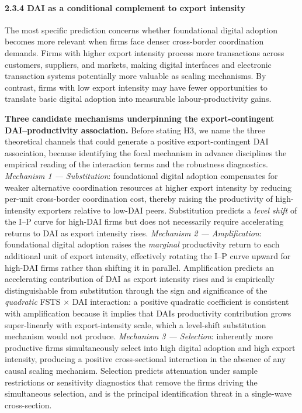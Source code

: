 \documentclass[12pt,a4paper]{article}
\begin{document}
\hypertarget{234-dai-as-a-conditional-complement-to-export-intensity}{%
\paragraph{2.3.4 DAI as a conditional complement to export
intensity}\label{234-dai-as-a-conditional-complement-to-export-intensity}}

The most specific prediction concerns whether foundational digital
adoption becomes more relevant when firms face denser cross-border
coordination demands. Firms with higher export intensity process more
transactions across customers, suppliers, and markets, making digital
interfaces and electronic transaction systems potentially more valuable
as scaling mechanisms. By contrast, firms with low export intensity may
have fewer opportunities to translate basic digital adoption into
measurable labour-productivity gains.

\textbf{Three candidate mechanisms underpinning the export-contingent
DAI--productivity association.} Before stating H3, we name the three
theoretical channels that could generate a positive export-contingent
DAI association, because identifying the focal mechanism in advance
disciplines the empirical reading of the interaction terms and the
robustness diagnostics. \emph{Mechanism 1 --- Substitution}:
foundational digital adoption compensates for weaker alternative
coordination resources at higher export intensity by reducing per-unit
cross-border coordination cost, thereby raising the productivity of
high-intensity exporters relative to low-DAI peers. Substitution
predicts a \emph{level shift} of the I--P curve for high-DAI firms but
does not necessarily require accelerating returns to DAI as export
intensity rises. \emph{Mechanism 2 --- Amplification}: foundational
digital adoption raises the \emph{marginal} productivity return to each
additional unit of export intensity, effectively rotating the I--P curve
upward for high-DAI firms rather than shifting it in parallel.
Amplification predicts an accelerating contribution of DAI as export
intensity rises and is empirically distinguishable from substitution
through the sign and significance of the \emph{quadratic} FSTS × DAI
interaction: a positive quadratic coefficient is consistent with
amplification because it implies that DAI\textquotesingle s productivity
contribution grows super-linearly with export-intensity scale, which a
level-shift substitution mechanism would not produce. \emph{Mechanism 3
--- Selection}: inherently more productive firms simultaneously select
into high digital adoption and high export intensity, producing a
positive cross-sectional interaction in the absence of any causal
scaling mechanism. Selection predicts attenuation under sample
restrictions or sensitivity diagnostics that remove the firms driving
the simultaneous selection, and is the principal identification threat
in a single-wave cross-section.
\end{document}
